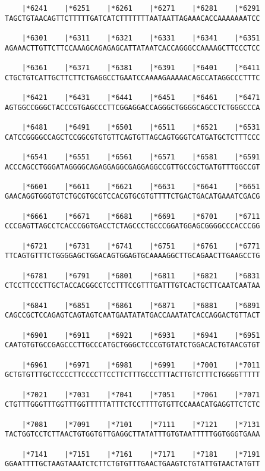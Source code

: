 \documentclass{article}
\begin{document}
\begin{Verbatim}
    |*6241    |*6251    |*6261    |*6271    |*6281    |*6291
TAGCTGTAACAGTTCTTTTTGATCATCTTTTTTTAATAATTAGAAACACCAAAAAAATCC
  
    |*6301    |*6311    |*6321    |*6331    |*6341    |*6351
AGAAACTTGTTCTTCCAAAGCAGAGAGCATTATAATCACCAGGGCCAAAAGCTTCCCTCC
  
    |*6361    |*6371    |*6381    |*6391    |*6401    |*6411
CTGCTGTCATTGCTTCTTCTGAGGCCTGAATCCAAAAGAAAAACAGCCATAGGCCCTTTC
  
    |*6421    |*6431    |*6441    |*6451    |*6461    |*6471
AGTGGCCGGGCTACCCGTGAGCCCTTCGGAGGACCAGGGCTGGGGCAGCCTCTGGGCCCA
  
    |*6481    |*6491    |*6501    |*6511    |*6521    |*6531
CATCCGGGGCCAGCTCCGGCGTGTGTTCAGTGTTAGCAGTGGGTCATGATGCTCTTTCCC
  
    |*6541    |*6551    |*6561    |*6571    |*6581    |*6591
ACCCAGCCTGGGATAGGGGCAGAGGAGGCGAGGAGGCCGTTGCCGCTGATGTTTGGCCGT
  
    |*6601    |*6611    |*6621    |*6631    |*6641    |*6651
GAACAGGTGGGTGTCTGCGTGCGTCCACGTGCGTGTTTTCTGACTGACATGAAATCGACG
  
    |*6661    |*6671    |*6681    |*6691    |*6701    |*6711
CCCGAGTTAGCCTCACCCGGTGACCTCTAGCCCTGCCCGGATGGAGCGGGGCCCACCCGG
  
    |*6721    |*6731    |*6741    |*6751    |*6761    |*6771
TTCAGTGTTTCTGGGGAGCTGGACAGTGGAGTGCAAAAGGCTTGCAGAACTTGAAGCCTG
  
    |*6781    |*6791    |*6801    |*6811    |*6821    |*6831
CTCCTTCCCTTGCTACCACGGCCTCCTTTCCGTTTGATTTGTCACTGCTTCAATCAATAA
  
    |*6841    |*6851    |*6861    |*6871    |*6881    |*6891
CAGCCGCTCCAGAGTCAGTAGTCAATGAATATATGACCAAATATCACCAGGACTGTTACT
  
    |*6901    |*6911    |*6921    |*6931    |*6941    |*6951
CAATGTGTGCCGAGCCCTTGCCCATGCTGGGCTCCCGTGTATCTGGACACTGTAACGTGT
  
    |*6961    |*6971    |*6981    |*6991    |*7001    |*7011
GCTGTGTTTGCTCCCCTTCCCCTTCCTTCTTTGCCCTTTACTTGTCTTTCTGGGGTTTTT
  
    |*7021    |*7031    |*7041    |*7051    |*7061    |*7071
CTGTTTGGGTTTGGTTTGGTTTTTATTTCTCCTTTTGTGTTCCAAACATGAGGTTCTCTC
  
    |*7081    |*7091    |*7101    |*7111    |*7121    |*7131
TACTGGTCCTCTTAACTGTGGTGTTGAGGCTTATATTTGTGTAATTTTTGGTGGGTGAAA
  
    |*7141    |*7151    |*7161    |*7171    |*7181    |*7191
GGAATTTTGCTAAGTAAATCTCTTCTGTGTTTGAACTGAAGTCTGTATTGTAACTATGTT
  

\end{Verbatim}
\end{document}

